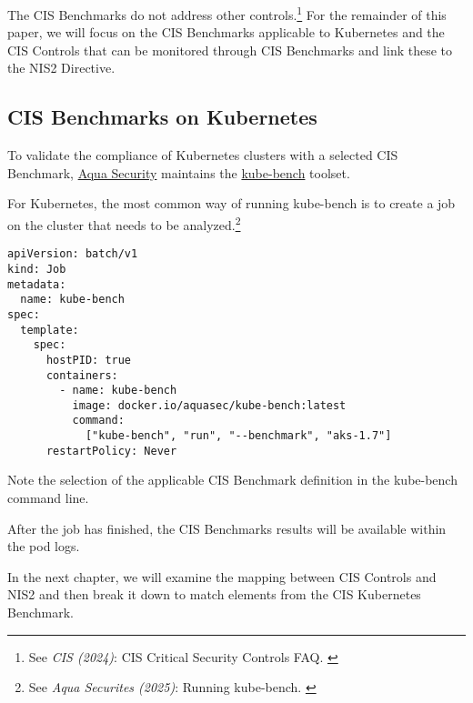 The CIS Benchmarks do not address other controls.\footnote{See \textit{CIS (2024)}: CIS Critical Security Controls FAQ. \cite{cisFaq}} For the remainder of this paper, we will focus on the CIS Benchmarks applicable to Kubernetes and the CIS Controls that can be monitored through CIS Benchmarks and link these to the NIS2 Directive.

\subsection{CIS Benchmarks on Kubernetes}

To validate the compliance of Kubernetes clusters with a selected CIS Benchmark, \href{https://www.aquasec.com/}{Aqua Security} maintains the \href{https://github.com/aquasecurity/kube-bench}{kube-bench} toolset.

For Kubernetes, the most common way of running kube-bench is to create a job on the cluster that needs to be analyzed.\footnote{See \textit{Aqua Securites (2025)}: Running kube-bench. \cite{kubeBench}}

\pagebreak

\begin{lstlisting}[caption=Kube-bench Job, frame=single, basicstyle=\ttfamily]
apiVersion: batch/v1
kind: Job
metadata:
  name: kube-bench
spec:
  template:
    spec:
      hostPID: true
      containers:
        - name: kube-bench
          image: docker.io/aquasec/kube-bench:latest
          command:
            ["kube-bench", "run", "--benchmark", "aks-1.7"]
      restartPolicy: Never            
\end{lstlisting}

Note the selection of the applicable CIS Benchmark definition in the kube-bench command line.

After the job has finished, the CIS Benchmarks results will be available within the pod logs.

In the next chapter, we will examine the mapping between CIS Controls and NIS2 and then break it down to match elements from the CIS Kubernetes Benchmark.
